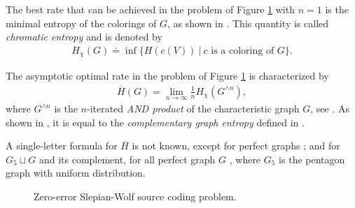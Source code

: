 \documentclass[conference,a4paper]{IEEEtran}
\def\ar#1{\textcolor{red}{\footnotesize {(ar: #1)}}}
\begin{document}
The best rate that can be achieved in the problem of Figure \ref{fig:SWzero} with $n = 1$ is the minimal entropy of the colorings of $G$, as shown in \cite{alon1996source}. This quantity is called \emph{chromatic entropy} and is denoted by 
\begin{align}
   H_{\chi}(G)\doteq \inf \lbrace H(c(V)) \:|\: c \text{ is a coloring of } G \rbrace.
\end{align}

The asymptotic optimal rate in the problem of Figure \ref{fig:SWzero} is characterized by
\begin{align}
        \overline{H}(G) = \lim_{n \rightarrow \infty} \frac{1}{n} H_{\chi}(G^{\wedge n}),\label{eq:debitopti}
\end{align}
where $G^{\wedge n}$ is the $n$-iterated \emph{AND product} of the characteristic graph $G$, see \cite{alon1996source}.
As shown in \cite{koulgi2003zero}, it is equal to the \emph{complementary graph entropy} defined in \cite{korner1973two}.

A single-letter formula for $\overline{H}$ is not known, except for perfect graphs \cite{csiszar1990entropy}; and for $G_5 \sqcup G$ and its complement, for all perfect graph $G$ \cite{tuncel2009complementary}, where $G_5$ is the pentagon graph with uniform distribution. %

\begin{figure}[t!]
    \centering
    \caption{Zero-error Slepian-Wolf source coding problem.}
    \label{fig:SWzero}
\end{figure}
\end{document}
